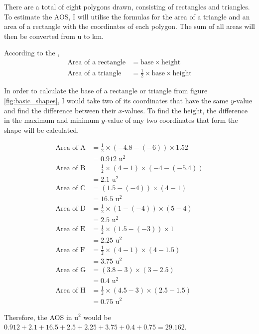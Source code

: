 \documentclass[12pt]{article}
\begin{document}
There are a total of eight polygons drawn, consisting of rectangles and triangles. To estimate the AOS, I will utilise the formulas for the area of a triangle and an area of a rectangle with the coordinates of each polygon. The sum of all areas will then be converted from u to km.
\newpage

According to the \cite{ib},
\bgroup
\singlespacing
\begin{align*}
    \text{Area of a rectangle}&= \text{base} \times \text{height}\\
    \text{Area of a triangle} &= \frac{1}{2}\times\text{base}\times\text{height}
\end{align*}
\egroup

In order to calculate the base of a rectangle or triangle from figure \ref{fig:basic_shapes}, I would take two of its coordinates that have the same $y$-value and find the difference between their $x$-values. To find the height, the difference in the maximum and minimum $y$-value of any two coordinates that form the shape will be calculated.

\bgroup
\singlespacing
\allowdisplaybreaks
\begin{align*}
    \text{Area of A} &= \frac{1}{2}\times(-4.8-(-6))\times1.52\\
    &=0.912 \text{ u}^2\\
    \text{Area of B} &= \frac{1}{2}\times(4-1)\times(-4-(-5.4))\\
    &=2.1 \text{ u}^2\\
    \text{Area of C} &= (1.5-(-4))\times(4-1)\\
    &=16.5 \text{ u}^2\\
    \text{Area of D} &= \frac{1}{2}\times(1-(-4))\times(5-4)\\
    &=2.5 \text{ u}^2\\
    \text{Area of E} &= \frac{1}{2}\times(1.5-(-3))\times1\\
    &=2.25 \text{ u}^2\\
    \text{Area of F} &= \frac{1}{2}\times(4-1)\times(4-1.5)\\
    &=3.75 \text{ u}^2\\
    \text{Area of G} &= (3.8-3)\times(3-2.5)\\
    &=0.4 \text{ u}^2\\
    \text{Area of H} &= \frac{1}{2}\times(4.5-3)\times(2.5-1.5)\\
    &=0.75 \text{ u}^2
\end{align*}
\egroup

Therefore, the AOS in $\text{u}^2$ would be $0.912+2.1+16.5+2.5+2.25+3.75+0.4+0.75=29.162$.\newline
\end{document}
